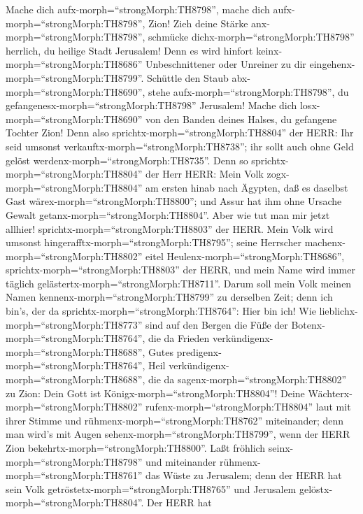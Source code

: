  Mache dich aufx-morph=``strongMorph:TH8798'', mache dich
aufx-morph=``strongMorph:TH8798'', Zion! Zieh deine Stärke
anx-morph=``strongMorph:TH8798'', schmücke
dichx-morph=``strongMorph:TH8798'' herrlich, du heilige Stadt Jerusalem!
Denn es wird hinfort keinx-morph=``strongMorph:TH8686'' Unbeschnittener
oder Unreiner zu dir eingehenx-morph=``strongMorph:TH8799''.
 Schüttle den Staub abx-morph=``strongMorph:TH8690'', stehe
aufx-morph=``strongMorph:TH8798'', du
gefangenesx-morph=``strongMorph:TH8798'' Jerusalem! Mache dich
losx-morph=``strongMorph:TH8690'' von den Banden deines Halses, du
gefangene Tochter Zion!  Denn also
sprichtx-morph=``strongMorph:TH8804'' der HERR: Ihr seid umsonst
verkauftx-morph=``strongMorph:TH8738''; ihr sollt auch ohne Geld gelöst
werdenx-morph=``strongMorph:TH8735''.  Denn so
sprichtx-morph=``strongMorph:TH8804'' der Herr HERR: Mein Volk
zogx-morph=``strongMorph:TH8804'' am ersten hinab nach Ägypten, daß es
daselbst Gast wärex-morph=``strongMorph:TH8800''; und Assur hat ihm ohne
Ursache Gewalt getanx-morph=``strongMorph:TH8804''.  Aber
wie tut man mir jetzt allhier! sprichtx-morph=``strongMorph:TH8803'' der
HERR. Mein Volk wird umsonst hingerafftx-morph=``strongMorph:TH8795'';
seine Herrscher machenx-morph=``strongMorph:TH8802'' eitel
Heulenx-morph=``strongMorph:TH8686'',
sprichtx-morph=``strongMorph:TH8803'' der HERR, und mein Name wird immer
täglich gelästertx-morph=``strongMorph:TH8711''.  Darum soll
mein Volk meinen Namen kennenx-morph=``strongMorph:TH8799'' zu derselben
Zeit; denn ich bin's, der da sprichtx-morph=``strongMorph:TH8764'': Hier
bin ich!  Wie lieblichx-morph=``strongMorph:TH8773'' sind
auf den Bergen die Füße der Botenx-morph=``strongMorph:TH8764'', die da
Frieden verkündigenx-morph=``strongMorph:TH8688'', Gutes
predigenx-morph=``strongMorph:TH8764'', Heil
verkündigenx-morph=``strongMorph:TH8688'', die da
sagenx-morph=``strongMorph:TH8802'' zu Zion: Dein Gott ist
Königx-morph=``strongMorph:TH8804''!  Deine
Wächterx-morph=``strongMorph:TH8802''
rufenx-morph=``strongMorph:TH8804'' laut mit ihrer Stimme und
rühmenx-morph=``strongMorph:TH8762'' miteinander; denn man wird's mit
Augen sehenx-morph=``strongMorph:TH8799'', wenn der HERR Zion
bekehrtx-morph=``strongMorph:TH8800''.  Laßt fröhlich
seinx-morph=``strongMorph:TH8798'' und miteinander
rühmenx-morph=``strongMorph:TH8761'' das Wüste zu Jerusalem; denn der
HERR hat sein Volk getröstetx-morph=``strongMorph:TH8765'' und Jerusalem
gelöstx-morph=``strongMorph:TH8804''.  Der HERR hat
